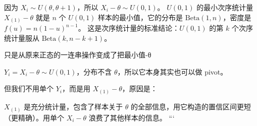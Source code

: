 \begin{note}
   
因为 $X_i \sim U(\theta, \theta+1)$，所以 $X_i - \theta \sim U(0,1)$。
$U(0,1)$ 的最小次序统计量 $X_{(1)} - \theta$ 就是 $n$ 个 $U(0,1)$ 样本的最小值，它的分布是 $\text{Beta}(1,n)$，密度是 $f(u) = n(1-u)^{n-1}$。
这是次序统计量的标准结论：$U(0,1)$ 的第 $k$ 个次序统计量服从 $\text{Beta}(k, n-k+1)$。

\end{note}
\begin{dxtips}
只是从原来正态的一连串操作变成了把最小值-θ

$Y_i = X_i - \theta \sim U(0,1)$，分布不含 $\theta$，所以它本身其实也可以做 pivot。

但我们不用单个 $Y_i$，而是用 $X_{(1)} - \theta$，原因是：

$X_{(1)}$ 是充分统计量，包含了样本关于 $\theta$ 的全部信息，用它构造的置信区间更短（更精确）。用单个 $X_i - \theta$ 浪费了其他样本的信息。
```
\end{dxtips}

